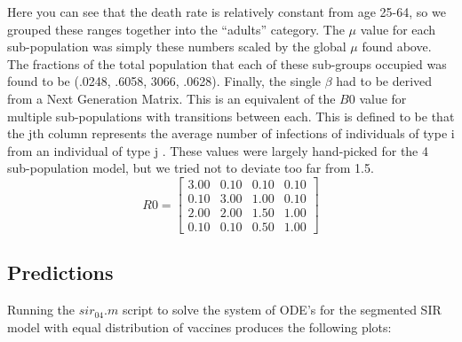 \documentclass[titlepage]{article}
\begin{document}
    Here you can see that the death rate is relatively constant from age 25-64, so we grouped these ranges together into the ``adults'' category. The $\mu$ value for each sub-population was simply these numbers scaled by the global $\mu$ found above. The fractions of the total population that each of these sub-groups occupied \cite{pop} was found to be (.0248, .6058, 3066, .0628). Finally, the single $\beta$ had to be derived from a Next Generation Matrix. This is an equivalent of the $B0$ value for multiple sub-populations with transitions between each. This is defined to be that the jth column represents the average number of infections of individuals of type i from an individual of type j \cite{SIR}. These values were largely hand-picked for the 4 sub-population model, but we tried not to deviate too far from 1.5.
    \[
        R0 = 
        \begin{bmatrix}
        3.00 & 0.10 & 0.10 & 0.10 \\
        0.10 & 3.00 & 1.00 & 0.10 \\
        2.00 & 2.00 & 1.50 & 1.00 \\
        0.10 & 0.10 & 0.50 & 1.00
        \end{bmatrix}
    \]

\subsection{Predictions}
	Running the $sir_{04}.m$ script to solve the system of ODE's for the segmented SIR model with equal distribution of vaccines produces the following plots:
\end{document}
